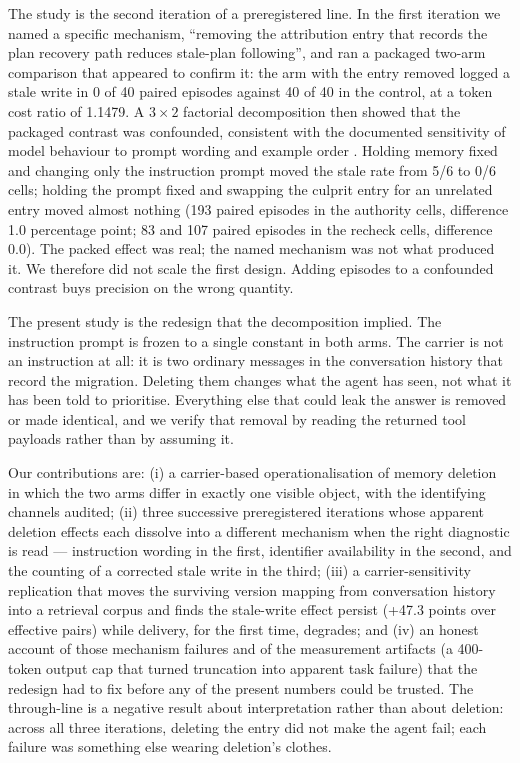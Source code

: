\documentclass[11pt]{article}
\begin{document}
\begin{sloppypar}
The study is the second iteration of a preregistered line. In the first iteration we named a specific mechanism, ``removing the attribution entry that records the plan recovery path reduces stale-plan following'', and ran a packaged two-arm comparison that appeared to confirm it: the arm with the entry removed logged a stale write in 0 of 40 paired episodes against 40 of 40 in the control, at a token cost ratio of 1.1479. A $3\times2$ factorial decomposition then showed that the packaged contrast was confounded, consistent with the documented sensitivity of model behaviour to prompt wording and example order \cite{sclar2023sensitivity,zhao2021calibrate}. Holding memory fixed and changing only the instruction prompt moved the stale rate from 5/6 to 0/6 cells; holding the prompt fixed and swapping the culprit entry for an unrelated entry moved almost nothing (193 paired episodes in the authority cells, difference 1.0 percentage point; 83 and 107 paired episodes in the recheck cells, difference 0.0). The packed effect was real; the named mechanism was not what produced it. We therefore did not scale the first design. Adding episodes to a confounded contrast buys precision on the wrong quantity.

The present study is the redesign that the decomposition implied. The instruction prompt is frozen to a single constant in both arms. The carrier is not an instruction at all: it is two ordinary messages in the conversation history that record the migration. Deleting them changes what the agent has seen, not what it has been told to prioritise. Everything else that could leak the answer is removed or made identical, and we verify that removal by reading the returned tool payloads rather than by assuming it.

Our contributions are: (i) a carrier-based operationalisation of memory deletion in which the two arms differ in exactly one visible object, with the identifying channels audited; (ii) three successive preregistered iterations whose apparent deletion effects each dissolve into a different mechanism when the right diagnostic is read --- instruction wording in the first, identifier availability in the second, and the counting of a corrected stale write in the third; (iii) a carrier-sensitivity replication that moves the surviving version mapping from conversation history into a retrieval corpus and finds the stale-write effect persist (+47.3 points over effective pairs) while delivery, for the first time, degrades; and (iv) an honest account of those mechanism failures and of the measurement artifacts (a 400-token output cap that turned truncation into apparent task failure) that the redesign had to fix before any of the present numbers could be trusted. The through-line is a negative result about interpretation rather than about deletion: across all three iterations, deleting the entry did not make the agent fail; each failure was something else wearing deletion's clothes.


\end{sloppypar}
\end{document}
